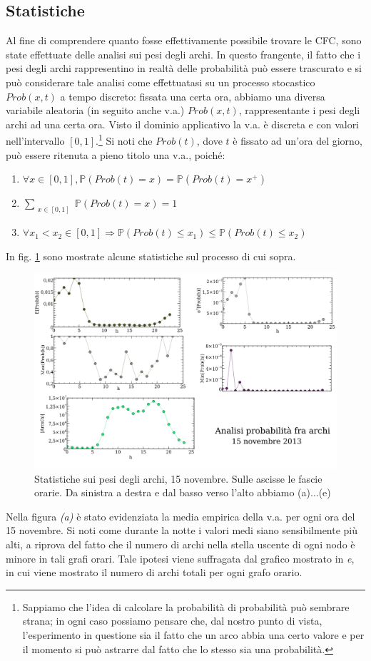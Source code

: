 \documentclass[10pt,a4paper]{article}
\begin{document}
\subsection{Statistiche}
Al fine di comprendere quanto fosse effettivamente possibile trovare le CFC, sono state effettuate delle analisi sui pesi degli archi. In questo frangente, il fatto che i pesi degli archi rappresentino in realtà delle probabilità può essere trascurato e si può considerare tale analisi come effettuatasi su un processo stocastico $Prob(x, t)$ a tempo discreto: fissata una certa ora, abbiamo una diversa variabile aleatoria (in seguito anche v.a.) $Prob(x, t)$, rappresentante i pesi degli archi ad una certa ora. Visto il dominio applicativo la v.a. è discreta e con valori nell'intervallo $[0,1]$.\footnote{Sappiamo che l'idea di calcolare la probabilità di probabilità può sembrare strana; in ogni caso possiamo pensare che, dal nostro punto di vista, l'esperimento in questione sia il fatto che un arco abbia una certo valore e per il momento si può astrarre dal fatto che lo stesso sia una probabilità.}
Si noti che $Prob(t)$, dove $t$ è fissato ad un'ora del giorno, può essere ritenuta a pieno titolo una v.a., poiché:
\begin{enumerate}
\item $\forall x \in [0,1], \mathbb{P}(Prob(t) = x) = \mathbb{P}(Prob(t) = x^+)$
\item $\sum_{\substack{x \in [0,1]}}{ \mathbb{P}(Prob(t) = x)} = 1$
\item $\forall x_1 < x_2 \in [0,1] \Rightarrow \mathbb{P}(Prob(t) \leq x_1) \leq \mathbb{P}(Prob(t) \leq x_2)$ 
\end{enumerate}
In fig. \ref{img:probs} sono mostrate alcune statistiche sul processo di cui sopra.
\begin{figure}
 \includegraphics[scale=.6]{img/probs15nov.png}
 \caption{Statistiche sui pesi degli archi, 15 novembre. Sulle ascisse le fascie orarie. Da sinistra a destra e dal basso verso l'alto abbiamo (a)...(e)}
 \label{img:probs}
\end{figure}
Nella figura \emph{(a)} è stato evidenziata la media empirica della v.a. per ogni ora del 15 novembre. Si noti come durante la notte i valori medi siano sensibilmente più alti, a riprova del fatto che il numero di archi nella stella uscente di ogni nodo è minore in tali grafi orari. Tale ipotesi viene suffragata dal grafico mostrato in \emph{e}, in cui viene mostrato il numero di archi totali per ogni grafo orario. 
\end{document}
